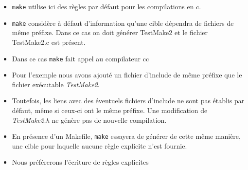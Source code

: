\begin{itemize}
\item \texttt{make} utilise ici des règles par défaut pour les compilations en c.
\item \texttt{make} considère à défaut d'information qu'une cible dépendra de fichiers de même préfixe. Dans ce cas on doit générer TestMake2 et le fichier TestMake2.c est présent.
\item Dans ce cas \texttt{make} fait appel au compilateur cc
\item Pour l'exemple nous avons ajouté un fichier d'include de même préfixe que le fichier exécutable \emph{TestMake2}.
\item Toutefois, les liens avec des éventuels fichiers d'include ne sont pas établis par défaut, même si ceux-ci ont le même préfixe. Une modification de \emph{TestMake2.h} ne génère  pas de nouvelle compilation.
\item En présence d'un Makefile, \texttt{make} essayera de générer de cette même manière, une cible pour laquelle aucune règle explicite n'est fournie.
\item Nous préférerons l'écriture de règles explicites
\end{itemize}
\newpage
